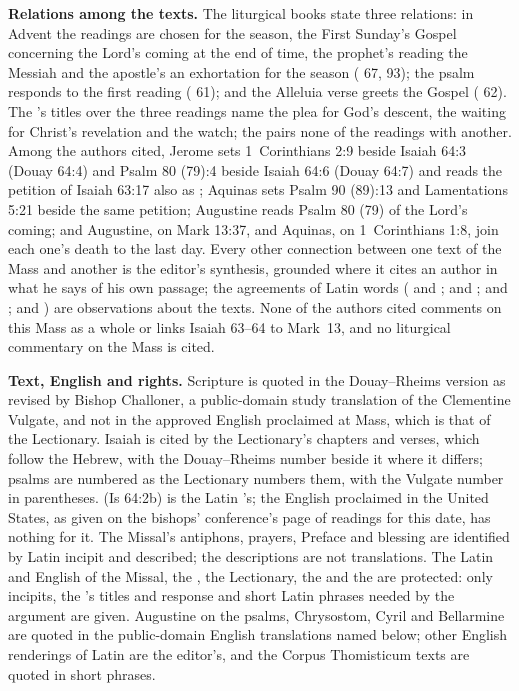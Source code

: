 {\textbf{Relations among the texts.} The liturgical books state three
relations: in Advent the readings are chosen for the season, the First
Sunday's Gospel concerning the Lord's coming at the end of time, the
prophet's reading the Messiah and the apostle's an exhortation for the season
( 67, 93); the psalm responds to the first reading
( 61); and the Alleluia verse greets the Gospel
( 62). The 's titles over the three
readings name the plea for God's descent, the waiting for Christ's revelation
and the watch; the  pairs none of the readings with another. Among
the authors cited, Jerome sets 1~Corinthians 2:9 beside Isaiah 64:3 (Douay
64:4) and Psalm 80 (79):4 beside Isaiah 64:6 (Douay 64:7)
and reads the petition of Isaiah 63:17 also as ; Aquinas
sets Psalm 90 (89):13 and Lamentations 5:21 beside the same petition; Augustine
reads Psalm 80 (79) of the Lord's coming; and Augustine, on Mark 13:37, and
Aquinas, on 1~Corinthians 1:8, join each one's death to the last day. Every
other connection between one text of the Mass and another is the editor's
synthesis, grounded where it cites an author in what he says of his own
passage; the agreements of Latin words ( and
;  and ;
 and ;  and ) are observations about the texts. None of the authors cited comments on
this Mass as a whole or links Isaiah 63--64 to Mark~13, and no liturgical
commentary on the Mass is cited.

\textbf{Text, English and rights.} Scripture is quoted in the Douay--Rheims
version as revised by Bishop Challoner, a public-domain study translation of
the Clementine Vulgate, and not in the approved English proclaimed at Mass,
which is that of the Lectionary. Isaiah is cited by the Lectionary's chapters
and verses, which follow the Hebrew, with the Douay--Rheims number beside it
where it differs; psalms are numbered as the Lectionary numbers them, with the
Vulgate number in parentheses.  (Is 64:2b) is the Latin
's; the English proclaimed in the United States, as given on the
bishops' conference's page of readings for this date, has nothing for it. The
Missal's antiphons, prayers, Preface and blessing are identified by Latin
incipit and described; the descriptions are not translations. The Latin and
English of the Missal, the , the Lectionary, the  and the  are protected: only incipits, the
's titles and response and short Latin phrases needed by the
argument are given. Augustine on the psalms, Chrysostom, Cyril and Bellarmine
are quoted in the public-domain English translations named below; other
English renderings of Latin are the editor's, and the Corpus Thomisticum texts
are quoted in short phrases.

}
